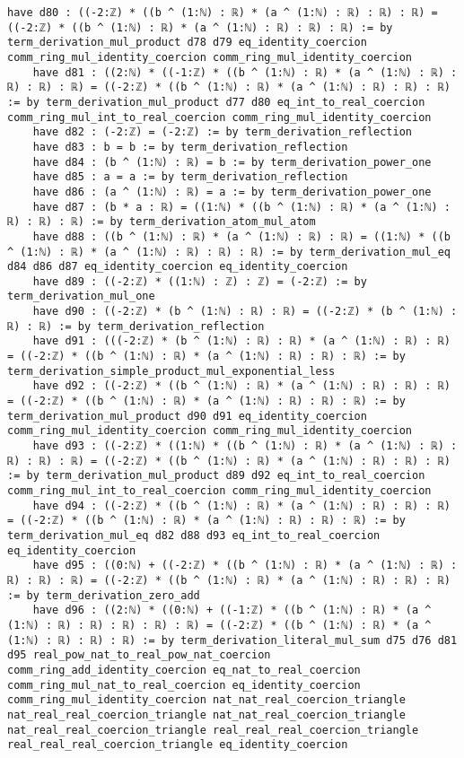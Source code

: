 \documentclass{article}
\begin{document}
\begin{tcolorbox}[colback=white!10, width=\linewidth]
\begin{lstlisting}[language=Lean4]
    have d80 : ((-2:ℤ) * ((b ^ (1:ℕ) : ℝ) * (a ^ (1:ℕ) : ℝ) : ℝ) : ℝ) = ((-2:ℤ) * ((b ^ (1:ℕ) : ℝ) * (a ^ (1:ℕ) : ℝ) : ℝ) : ℝ) := by term_derivation_mul_product d78 d79 eq_identity_coercion comm_ring_mul_identity_coercion comm_ring_mul_identity_coercion
    have d81 : ((2:ℕ) * ((-1:ℤ) * ((b ^ (1:ℕ) : ℝ) * (a ^ (1:ℕ) : ℝ) : ℝ) : ℝ) : ℝ) = ((-2:ℤ) * ((b ^ (1:ℕ) : ℝ) * (a ^ (1:ℕ) : ℝ) : ℝ) : ℝ) := by term_derivation_mul_product d77 d80 eq_int_to_real_coercion comm_ring_mul_int_to_real_coercion comm_ring_mul_identity_coercion
    have d82 : (-2:ℤ) = (-2:ℤ) := by term_derivation_reflection
    have d83 : b = b := by term_derivation_reflection
    have d84 : (b ^ (1:ℕ) : ℝ) = b := by term_derivation_power_one
    have d85 : a = a := by term_derivation_reflection
    have d86 : (a ^ (1:ℕ) : ℝ) = a := by term_derivation_power_one
    have d87 : (b * a : ℝ) = ((1:ℕ) * ((b ^ (1:ℕ) : ℝ) * (a ^ (1:ℕ) : ℝ) : ℝ) : ℝ) := by term_derivation_atom_mul_atom
    have d88 : ((b ^ (1:ℕ) : ℝ) * (a ^ (1:ℕ) : ℝ) : ℝ) = ((1:ℕ) * ((b ^ (1:ℕ) : ℝ) * (a ^ (1:ℕ) : ℝ) : ℝ) : ℝ) := by term_derivation_mul_eq d84 d86 d87 eq_identity_coercion eq_identity_coercion
    have d89 : ((-2:ℤ) * ((1:ℕ) : ℤ) : ℤ) = (-2:ℤ) := by term_derivation_mul_one
    have d90 : ((-2:ℤ) * (b ^ (1:ℕ) : ℝ) : ℝ) = ((-2:ℤ) * (b ^ (1:ℕ) : ℝ) : ℝ) := by term_derivation_reflection
    have d91 : (((-2:ℤ) * (b ^ (1:ℕ) : ℝ) : ℝ) * (a ^ (1:ℕ) : ℝ) : ℝ) = ((-2:ℤ) * ((b ^ (1:ℕ) : ℝ) * (a ^ (1:ℕ) : ℝ) : ℝ) : ℝ) := by term_derivation_simple_product_mul_exponential_less
    have d92 : ((-2:ℤ) * ((b ^ (1:ℕ) : ℝ) * (a ^ (1:ℕ) : ℝ) : ℝ) : ℝ) = ((-2:ℤ) * ((b ^ (1:ℕ) : ℝ) * (a ^ (1:ℕ) : ℝ) : ℝ) : ℝ) := by term_derivation_mul_product d90 d91 eq_identity_coercion comm_ring_mul_identity_coercion comm_ring_mul_identity_coercion
    have d93 : ((-2:ℤ) * ((1:ℕ) * ((b ^ (1:ℕ) : ℝ) * (a ^ (1:ℕ) : ℝ) : ℝ) : ℝ) : ℝ) = ((-2:ℤ) * ((b ^ (1:ℕ) : ℝ) * (a ^ (1:ℕ) : ℝ) : ℝ) : ℝ) := by term_derivation_mul_product d89 d92 eq_int_to_real_coercion comm_ring_mul_int_to_real_coercion comm_ring_mul_identity_coercion
    have d94 : ((-2:ℤ) * ((b ^ (1:ℕ) : ℝ) * (a ^ (1:ℕ) : ℝ) : ℝ) : ℝ) = ((-2:ℤ) * ((b ^ (1:ℕ) : ℝ) * (a ^ (1:ℕ) : ℝ) : ℝ) : ℝ) := by term_derivation_mul_eq d82 d88 d93 eq_int_to_real_coercion eq_identity_coercion
    have d95 : ((0:ℕ) + ((-2:ℤ) * ((b ^ (1:ℕ) : ℝ) * (a ^ (1:ℕ) : ℝ) : ℝ) : ℝ) : ℝ) = ((-2:ℤ) * ((b ^ (1:ℕ) : ℝ) * (a ^ (1:ℕ) : ℝ) : ℝ) : ℝ) := by term_derivation_zero_add
    have d96 : ((2:ℕ) * ((0:ℕ) + ((-1:ℤ) * ((b ^ (1:ℕ) : ℝ) * (a ^ (1:ℕ) : ℝ) : ℝ) : ℝ) : ℝ) : ℝ) = ((-2:ℤ) * ((b ^ (1:ℕ) : ℝ) * (a ^ (1:ℕ) : ℝ) : ℝ) : ℝ) := by term_derivation_literal_mul_sum d75 d76 d81 d95 real_pow_nat_to_real_pow_nat_coercion comm_ring_add_identity_coercion eq_nat_to_real_coercion comm_ring_mul_nat_to_real_coercion eq_identity_coercion comm_ring_mul_identity_coercion nat_nat_real_coercion_triangle nat_real_real_coercion_triangle nat_nat_real_coercion_triangle nat_real_real_coercion_triangle real_real_real_coercion_triangle real_real_real_coercion_triangle eq_identity_coercion

\end{lstlisting}
\end{tcolorbox}
\end{document}
